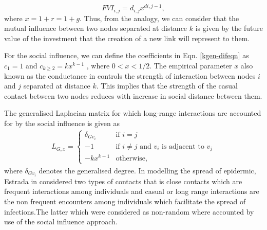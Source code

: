 \documentclass[10pt,a4paper]{article}
\begin{document}
    	    	\begin{equation}
    	    	FVI_{i,j} = d_{i,j} x^{d{i,j}-1},
    	    	\end{equation}
    	    	where $x = 1+r = 1+g$.
    	    	Thus, from the analogy, we can consider that the mutual influence between two nodes separated at distance $k$ is given by the future value of the investment that the creation of a new link will represent to them. 
    	    	
    	    	For the social influence, we can define the coefficients in Eqn. \ref{kgen-difeqn} as $c_1 =1 $ and $c_{k \geq 2} = k x^{k-1}$
    	    	, where $0 < x < 1 / 2$. The empirical parameter $x$ also known as the conductance in \citep{estrada2011epidemic} controls the strength of interaction between nodes $i$ and $j$ separated at distance $k$. This implies that the strength of the casual contact  between two nodes reduces with increase in social distance between them.
    	    	
    	    	The generalised Laplacian matrix for which long-range interactions are accounted for by the social influence is given as 
    	    	\begin{eqnarray}
    	    	L_{G,x} = \begin{cases} \delta_{Gv_i} &\mbox{if } i = j \\
    	    	-1 &\mbox{if } i \neq j \text{ and } v_i \text{ is adjacent to } v_j \\
    	    	-k x^{k-1} & \text{otherwise},
    	    	\end{cases}
    	    	\end{eqnarray}
    	    	where $\delta_{Gv_i}$ denotes the generalised degree.
    	    	 In modelling the spread of epidermic, Estrada in \citep{estrada2011epidemic} considered two types of contacts that is   close contacts  which are frequent interactions among individuals and casual or long range interactions are the non frequent encounters among individuals which facilitate the spread of infections.The latter which were considered as non-random where accounted by use of the social influence approach.
    	    	 
    	    	 
    	    	
\end{document}
